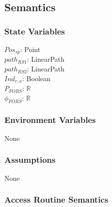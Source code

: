 \documentclass[12pt, titlepage]{article}
\begin{document}
\subsection{Semantics}

\subsubsection{State Variables} 
$Pos_{sp}$: Point\\
$path_{RS1}$: LinearPath\\
$path_{RS2}$: LinearPath\\
$Ind_{r,x}$: Boolean\\
$P_{FORS}$: $\mathbb{R}$\\
$\phi_{FORS}$: $\mathbb{R}$\\

\subsubsection{Environment Variables} None

\subsubsection{Assumptions} None

\subsubsection{Access Routine Semantics}
\end{document}
